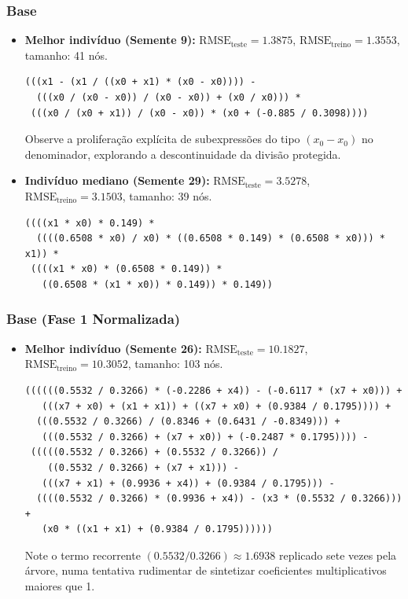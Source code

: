 \subsubsection{Base }
\begin{itemize}
  \item \textbf{Melhor indivíduo (Semente 9):}
        $\text{RMSE}_{\text{teste}} = 1.3875$, $\text{RMSE}_{\text{treino}} = 1.3553$, tamanho: 41 nós.
\begin{lstlisting}
(((x1 - (x1 / ((x0 + x1) * (x0 - x0)))) -
  (((x0 / (x0 - x0)) / (x0 - x0)) + (x0 / x0))) *
 (((x0 / (x0 + x1)) / (x0 - x0)) * (x0 + (-0.885 / 0.3098))))
\end{lstlisting}
  Observe a proliferação explícita de subexpressões do tipo $(x_0 - x_0)$ no
  denominador, explorando a descontinuidade da divisão protegida.
  \item \textbf{Indivíduo mediano (Semente 29):}
        $\text{RMSE}_{\text{teste}} = 3.5278$, $\text{RMSE}_{\text{treino}} = 3.1503$, tamanho: 39 nós.
\begin{lstlisting}
((((x1 * x0) * 0.149) *
  ((((0.6508 * x0) / x0) * ((0.6508 * 0.149) * (0.6508 * x0))) * x1)) *
 ((((x1 * x0) * (0.6508 * 0.149)) *
   ((0.6508 * (x1 * x0)) * 0.149)) * 0.149))
\end{lstlisting}
\end{itemize}

\subsubsection{Base  (Fase 1 Normalizada)}
\begin{itemize}
  \item \textbf{Melhor indivíduo (Semente 26):}
        $\text{RMSE}_{\text{teste}} = 10.1827$, $\text{RMSE}_{\text{treino}} = 10.3052$, tamanho: 103 nós.
\begin{lstlisting}
((((((0.5532 / 0.3266) * (-0.2286 + x4)) - (-0.6117 * (x7 + x0))) +
   (((x7 + x0) + (x1 + x1)) + ((x7 + x0) + (0.9384 / 0.1795)))) +
  (((0.5532 / 0.3266) / (0.8346 + (0.6431 / -0.8349))) +
   (((0.5532 / 0.3266) + (x7 + x0)) + (-0.2487 * 0.1795)))) -
 (((((0.5532 / 0.3266) + (0.5532 / 0.3266)) /
    ((0.5532 / 0.3266) + (x7 + x1))) -
   (((x7 + x1) + (0.9936 + x4)) + (0.9384 / 0.1795))) -
  ((((0.5532 / 0.3266) * (0.9936 + x4)) - (x3 * (0.5532 / 0.3266))) +
   (x0 * ((x1 + x1) + (0.9384 / 0.1795))))))
\end{lstlisting}
  Note o termo recorrente $(0.5532 / 0.3266) \approx 1.6938$ replicado sete
  vezes pela árvore, numa tentativa rudimentar de sintetizar coeficientes
  multiplicativos maiores que 1.
\end{itemize}

